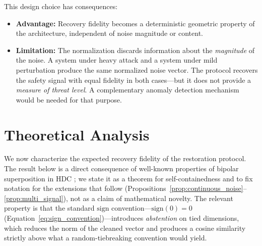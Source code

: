 \documentclass[a4paper,11pt]{article}
\begin{document}
This design choice has consequences:
\begin{itemize}
    \item \textbf{Advantage:} Recovery fidelity becomes a deterministic geometric property of the architecture, independent of noise magnitude or content.
    \item \textbf{Limitation:} The normalization discards information about the \textit{magnitude} of the noise. A system under heavy attack and a system under mild perturbation produce the same normalized noise vector. The protocol recovers the safety signal with equal fidelity in both cases---but it does not provide a \textit{measure of threat level}. A complementary anomaly detection mechanism would be needed for that purpose.
\end{itemize}

\section{Theoretical Analysis}

We now characterize the expected recovery fidelity of the restoration protocol. The result below is a direct consequence of well-known properties of bipolar superposition in HDC \cite{kanerva2009}; we state it as a theorem for self-containedness and to fix notation for the extensions that follow (Propositions~\ref{prop:continuous_noise}--\ref{prop:multi_signal}), not as a claim of mathematical novelty. The relevant property is that the standard $\text{sign}$ convention---$\text{sign}(0) = 0$ (Equation~\ref{eq:sign_convention})---introduces \textit{abstention} on tied dimensions, which reduces the norm of the cleaned vector and produces a cosine similarity strictly above what a random-tiebreaking convention would yield.
\end{document}
